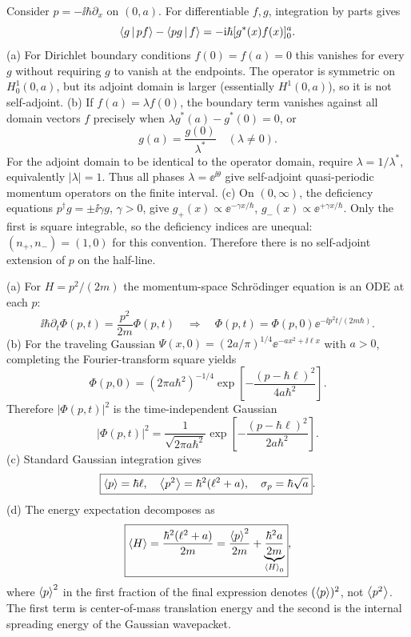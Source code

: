 Consider $p=-\ii\hbar\partial_x$ on $(0,a)$.
For differentiable $f,g$,
integration by parts gives
\begin{equation}
\left\langle g\,\middle|\,pf\right\rangle-\left\langle pg\,\middle|\,f\right\rangle
=-\mathrm{i}\hbar[g^*(x)f(x)]_0^a.
\end{equation}
(a) For Dirichlet boundary conditions
$f(0)=f(a)=0$ this vanishes for every $g$
without requiring $g$ to vanish at the
endpoints. The operator is symmetric on
$H_0^1(0,a)$, but its adjoint domain is
larger (essentially $H^1(0,a)$), so it is
not self-adjoint.
(b) If $f(a)=\lambda f(0)$,
the boundary term vanishes against all
domain vectors $f$ precisely when
$\lambda g^*(a)-g^*(0)=0$,
or
\begin{equation}
\boxed{g(a)=\frac{g(0)}{\lambda^*}}
\quad(\lambda\ne0).
\end{equation}
For the adjoint domain to be identical
to the operator domain, require
$\lambda=1/\lambda^*$, equivalently
$\boxed{|\lambda|=1}$.
Thus all phases $\lambda=\ee^{\ii\theta}$
give self-adjoint quasi-periodic momentum
operators on the finite interval.
(c) On $(0,\infty)$, the deficiency equations
$p^\dagger g=\pm\ii\gamma g$, $\gamma>0$,
give
$g_+(x)\propto\ee^{-\gamma x/\hbar}$,
$g_-(x)\propto\ee^{+\gamma x/\hbar}$.
Only the first is square integrable,
so the deficiency indices are unequal:
$\boxed{(n_+,n_-)=(1,0)}$ for this convention.
Therefore there is no self-adjoint
extension of $p$ on the half-line.

(a) For $H=p^2/(2m)$ the momentum-space
Schrödinger equation is an ODE at each $p$:
\begin{equation}
\ii\hbar\partial_t\Phi(p,t)=
\frac{p^2}{2m}\Phi(p,t)
\quad\Longrightarrow\quad
\boxed{\Phi(p,t)=
\Phi(p,0)\ee^{-\ii p^2t/(2m\hbar)}}.
\end{equation}
(b) For the traveling Gaussian
$\Psi(x,0)=(2a/\pi)^{1/4}
\ee^{-ax^2+\ii\ell x}$ with $a>0$,
completing the Fourier-transform square yields
\begin{equation}
\boxed{\Phi(p,0)=
(2\pi a\hbar^2)^{-1/4}
\exp\left[-\frac{(p-\hbar\ell)^2}
{4a\hbar^2}\right]}.
\end{equation}
Therefore $|\Phi(p,t)|^2$ is the
time-independent Gaussian
\begin{equation}
\boxed{|\Phi(p,t)|^2=
\frac1{\sqrt{2\pi a\hbar^2}}
\exp\left[-\frac{(p-\hbar\ell)^2}
{2a\hbar^2}\right]}.
\end{equation}
(c) Standard Gaussian integration gives
\begin{equation}
\boxed{\left\langle p\right\rangle=\hbar\ell,\quad
\left\langle p^2\right\rangle=\hbar^2(\ell^2+a),\quad
\sigma_p=\hbar\sqrt a}.
\end{equation}
(d) The energy expectation decomposes as
\begin{equation}
\boxed{\left\langle H\right\rangle=\frac{\hbar^2(\ell^2+a)}{2m}
=\frac{\left\langle p\right\rangle^2}{2m}
+\underbrace{\frac{\hbar^2 a}{2m}}_{\left\langle H\right\rangle_0}},
\end{equation}
where $\left\langle p\right\rangle^2$ in the first fraction
of the final expression denotes
$(\left\langle p\right\rangle)^2$, not $\left\langle p^2\right\rangle$.
The first term is center-of-mass
translation energy and the second is
the internal spreading energy of
the Gaussian wavepacket.
